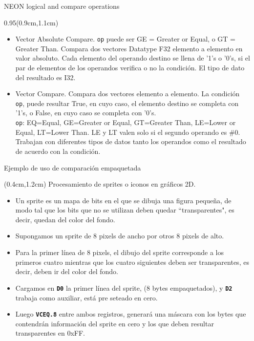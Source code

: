 \begin{frame}{NEON logical and compare operations}
 \begin{textblock*}{0.95\textwidth}(0.9cm,1.1cm)
  \begin{itemize}\justifying
   \item [VACop] Vector Absolute Compare. \texttt{op} puede ser GE = Greater or Equal, o GT = Greater Than. Compara dos vectores Datatype F32 elemento a elemento en valor absoluto. Cada elemento del operando  destino se llena de '1's o '0's, si el par de elementos de los operandos verifica o no la condición. El tipo de dato del resultado es I32.
   \item [VCop] Vector Compare. Compara dos vectores elemento a elemento. La condición \texttt{op}, puede resultar True, en cuyo caso, el elemento destino se completa con '1's, o False, en cuyo caso se completa con '0's.\\
   \texttt{op}: EQ=Equal, GE=Greater or Equal, GT=Greater Than, LE=Lower or Equal, LT=Lower Than. LE y LT valen solo si el segundo operando es \#0.\\
   Trabajan con diferentes tipos de datos tanto los operandos como el resultado de acuerdo con la condición.
  \end{itemize}
 \end{textblock*}
\end{frame}

\begin{frame}{Ejemplo de uso de comparación empaquetada}
 \begin{textblock*}{\textwidth}(0.4cm,1.2cm)
  \Large \centering Procesamiento de sprites o iconos en gráficos 2D. 
  \normalsize
  \begin{itemize}[<+(1)->] \justifying %
   \item Un sprite es un mapa de bits en el que se dibuja una figura pequeña, de modo tal que los bits que no se utilizan deben quedar \textquotedblleft transparentes", es decir, quedan del color del fondo.
   \item Supongamos un sprite de 8 pixels de ancho por otros 8 pixels de alto. 
   \item Para la primer línea de 8 pixels, el dibujo del sprite corresponde a los primeros cuatro mientras que los cuatro siguientes deben ser transparentes, es decir, deben ir del color del fondo.
   \item Cargamos en \textbf{\texttt{D0}} la primer línea del sprite, (8 bytes empaquetados), y \textbf{\texttt{D2}} trabaja como auxiliar, está pre seteado en cero.
   \item Luego \texttt{\textbf{VCEQ.8}} entre ambos registros, generará una máscara con los bytes que contendrán información del sprite en cero y los que deben resultar transparentes en 0xFF.
  \end{itemize}
 \end{textblock*}
\end{frame}

